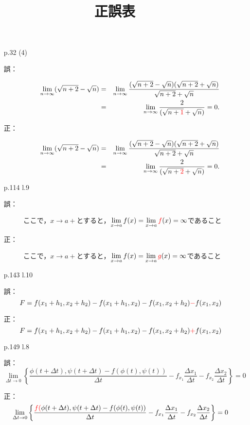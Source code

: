 \documentclass[pdflatex,ja=standard,a4paper]{bxjsarticle}
\title{正誤表}
\author{}
\begin{document}
\maketitle


\begin{enumerate}
\item[p.32 (4)]\quad 
\begin{description}
\item[誤：] 
\begin{eqnarray*}
			\lim_{n\to\infty}(\sqrt{n+2}-\sqrt{n})
			&=& \lim_{n\to\infty}
			\frac{(\sqrt{n+2}-\sqrt{n})(\sqrt{n+2}+\sqrt{n})}{\sqrt{n+2}+\sqrt{n}}\\
			&=& \lim_{n\to\infty}
			\frac{2}{(\sqrt{n+\textcolor{red}{1}}+\sqrt{n})}=0.
\end{eqnarray*}
\item[正：] 
\begin{eqnarray*}
			\lim_{n\to\infty}(\sqrt{n+2}-\sqrt{n})
			&=& \lim_{n\to\infty}
			\frac{(\sqrt{n+2}-\sqrt{n})(\sqrt{n+2}+\sqrt{n})}{\sqrt{n+2}+\sqrt{n}}\\
		&=& \lim_{n\to\infty}
		\frac{2}{(\sqrt{n+\textcolor{red}{2}}+\sqrt{n})}=0.
\end{eqnarray*}
\end{description}
\item[p.114 l.9]\quad 
\begin{description}
\item[誤：] 
ここで，$x\to a+$とすると，${\displaystyle\lim_{x\to a}f(x)=\lim_{x\to a}\textcolor{red}{f}(x)=\infty}$であること
\item[正：] 
ここで，$x\to a+$とすると，${\displaystyle\lim_{x\to a}f(x)=\lim_{x\to a}\textcolor{red}{g}(x)=\infty}$であること
\end{description}
\item[p.143 l.10]
\item[誤：] 
$$F=f(x_1+h_1,x_2+h_2)-f(x_1+h_1,x_2)-f(x_1,x_2+h_2)\textcolor{red}{-}f(x_1,x_2)$$
\item[正：] 
$$F=f(x_1+h_1,x_2+h_2)-f(x_1+h_1,x_2)-f(x_1,x_2+h_2)\textcolor{red}{+}f(x_1,x_2)$$
\item[p.149 l.8]
\item[誤：] 
$$\lim_{\Delta t\to0}
\left\{
\frac{\phi(t+\Delta t),\psi(t+\Delta t)-f(\phi(t),\psi(t))}{\Delta t}-f_{x_1}\frac{\Delta x_1}{\Delta t}-f_{x_2}\frac{\Delta x_2}{\Delta t}
\right\}=0$$
\item[正：] 
$$\lim_{\Delta t\to0}
\left\{
\frac{\textcolor{red}{f(}\phi(t+\Delta t),\psi(t+\Delta t)-f(\phi(t),\psi(t))}{\Delta t}-f_{x_1}\frac{\Delta x_1}{\Delta t}-f_{x_2}\frac{\Delta x_2}{\Delta t}
\right\}=0$$
\end{enumerate}
\end{document}
